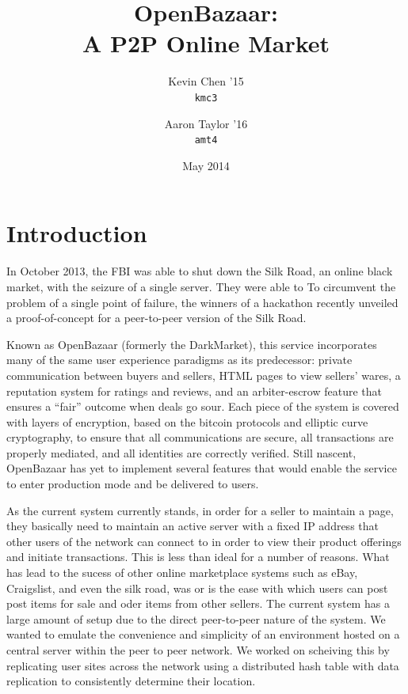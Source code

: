 \documentclass[12pt,twocolumn]{article}
\title{\bf \sc OpenBazaar: \\ A P2P Online Market}
\author{
    {\rm Kevin Chen '15} \\
    {\tt kmc3}
    \and 
    {\rm Aaron Taylor '16} \\
    {\tt amt4}
}
\date{May 2014}
\begin{document}
\maketitle

\doublespacing



\section{Introduction}
In October 2013, the FBI was able to shut down the Silk Road, an online black market, with the seizure of a single server. They were able to 
To circumvent the problem of a single point of failure, the winners of a hackathon recently unveiled a proof-of-concept for a peer-to-peer version of the Silk Road.

Known as OpenBazaar (formerly the DarkMarket), this service incorporates many of the same user experience paradigms as its predecessor: private communication between buyers and sellers, HTML pages to view sellers' wares, a reputation system for ratings and reviews, and an arbiter-escrow feature that ensures a ``fair'' outcome when deals go sour. Each piece of the system is covered with layers of encryption, based on the bitcoin protocols and elliptic curve cryptography, to ensure that all communications are secure, all transactions are properly mediated, and all identities are correctly verified.
Still nascent, OpenBazaar has yet to implement several features that would enable the service to enter production mode and be delivered to users.

As the current system currently stands, in order for a seller to maintain a page, they basically need to maintain an active server with a fixed IP address that other users of the network can connect to in order to view their product offerings and initiate transactions. This is less than ideal for a number of reasons. What has lead to the sucess of other online marketplace systems such as eBay, Craigslist, and even the silk road, was or is the ease with which users can post post items for sale and oder items from other sellers. The current system has a large amount of setup due to the direct peer-to-peer nature of the system. We wanted to emulate the convenience and simplicity of an environment hosted on a central server within the peer to peer network. We worked on scheiving this by replicating user sites across the network using a distributed hash table with data replication to consistently determine their location.
\end{document}
